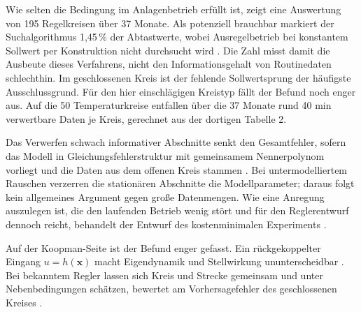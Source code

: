 Wie selten die Bedingung im Anlagenbetrieb erfüllt ist, zeigt eine
Auswertung von 195 Regelkreisen über 37 Monate. Als potenziell brauchbar
markiert der Suchalgorithmus 1,45\,\% der Abtastwerte, wobei
Ausregelbetrieb bei konstantem Sollwert per Konstruktion nicht durchsucht
wird \cite{bittencourtAlgorithmFindingProcess2015}. Die Zahl misst damit
die Ausbeute dieses Verfahrens, nicht den Informationsgehalt von
Routinedaten schlechthin. Im geschlossenen Kreis ist der fehlende
Sollwertsprung der häufigste Ausschlussgrund.
Für den hier einschlägigen Kreistyp fällt der Befund noch enger aus. Auf
die 50 Temperaturkreise entfallen über die 37 Monate rund 40 min
verwertbare Daten je Kreis, gerechnet aus der dortigen Tabelle 2.

Das Verwerfen schwach informativer Abschnitte senkt den Gesamtfehler,
sofern das Modell in Gleichungsfehlerstruktur mit gemeinsamem
Nennerpolynom vorliegt und die Daten aus dem offenen Kreis stammen
\cite{carretteDiscardingDataMay1996}. Bei untermodelliertem Rauschen
verzerren die stationären Abschnitte die Modellparameter; daraus folgt
kein allgemeines Argument gegen große Datenmengen. Wie eine
Anregung auszulegen ist, die den laufenden Betrieb wenig stört und für
den Reglerentwurf dennoch reicht, behandelt der Entwurf des
kostenminimalen Experiments \cite{bomboisLeastCostlyIdentification2006}.

Auf der Koopman-Seite ist der Befund enger gefasst. Ein rückgekoppelter
Eingang $u = h(\mathbf x)$ macht Eigendynamik und Stellwirkung
ununterscheidbar \cite{proctorGeneralizingKoopmanTheory2018}.
Bei bekanntem Regler lassen sich Kreis und Strecke gemeinsam und unter
Nebenbedingungen schätzen, bewertet am Vorhersagefehler des geschlossenen
Kreises \cite{dahdahClosedloopKoopmanOperator2024}.




